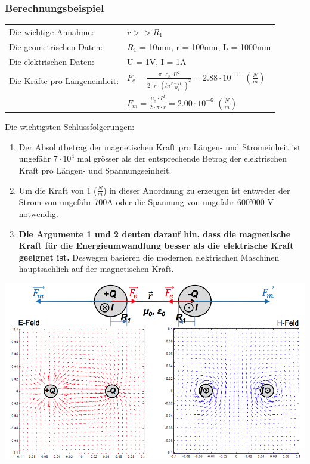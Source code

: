 \subsubsection{Berechnungsbeispiel}
\begin{tabular}{ll}
Die wichtige Annahme: & $r >> R_1$ \\
Die geometrischen Daten: & $R_{1}$ = 10mm, r = 100mm, L = 1000mm\\
Die elektrischen Daten:& U = 1V, I = 1A  \\
Die Kräfte pro Längeneinheit: &$F_{e} = \frac{\pi \cdot \epsilon_{0} \cdot U^{2}}{2 \cdot r \cdot (ln\frac{r-R_{1}}{R_{1}})^{2}} = 2.88 \cdot 10^{-11}$ $(\frac{N}{m})$ \\
&$F_{m} = \frac{\mu_{0} \cdot I^{2}}{2 \cdot \pi \cdot r} = 2.00 \cdot 10^{-6}$ $(\frac{N}{m})$ \\
\end{tabular}

Die wichtigsten Schlussfolgerungen:
\begin{enumerate}
\item Der Absolutbetrag der magnetischen Kraft pro Längen- und Stromeinheit ist ungefähr $7 \cdot 10^{4}$ mal grösser als der entsprechende Betrag der elektrischen Kraft pro Längen- und Spannungseinheit.
\item Um die Kraft von 1 ($\frac{N}{m}$) in dieser Anordnung zu erzeugen ist entweder der Strom von ungefähr 700A oder die Spannung von ungefähr 600'000 V notwendig. 
\item \textbf{Die Argumente 1 und 2 deuten darauf hin, dass die magnetische Kraft für die Energieumwandlung besser als die elektrische Kraft geeignet ist.} Deswegen basieren die modernen elektrischen Maschinen hauptsächlich auf der magnetischen Kraft.
\end{enumerate}
    \includegraphics[width = 0.75\linewidth]{./Pics/VL1/magKraft}
    
